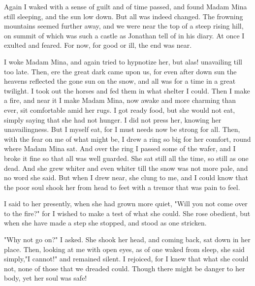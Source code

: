 Again I waked with a sense of guilt and of time passed, and found Madam Mina still sleeping, and the sun low down. But all was indeed changed. The frowning mountains seemed further away, and we were near the top of a steep rising hill, on summit of which was such a castle as Jonathan tell of in his diary. At once I exulted and feared. For now, for good or ill, the end was near. 

I woke Madam Mina, and again tried to hypnotize her, but alas! unavailing till too late. Then, ere the great dark came upon us, for even after down sun the heavens reflected the gone sun on the snow, and all was for a time in a great twilight. I took out the horses and fed them in what shelter I could. Then I make a fire, and near it I make Madam Mina, now awake and more charming than ever, sit comfortable amid her rugs. I got ready food, but she would not eat, simply saying that she had not hunger. I did not press her, knowing her unavailingness. But I myself eat, for I must needs now be strong for all. Then, with the fear on me of what might be, I drew a ring so big for her comfort, round where Madam Mina sat. And over the ring I passed some of the wafer, and I broke it fine so that all was well guarded. She sat still all the time, so still as one dead. And she grew whiter and even whiter till the snow was not more pale, and no word she said. But when I drew near, she clung to me, and I could know that the poor soul shook her from head to feet with a tremor that was pain to feel. 

I said to her presently, when she had grown more quiet, "Will you not come over to the fire?" for I wished to make a test of what she could. She rose obedient, but when she have made a step she stopped, and stood as one stricken. 

"Why not go on?" I asked. She shook her head, and coming back, sat down in her place. Then, looking at me with open eyes, as of one waked from sleep, she said simply,"I cannot!" and remained silent. I rejoiced, for I knew that what she could not, none of those that we dreaded could. Though there might be danger to her body, yet her soul was safe! 

